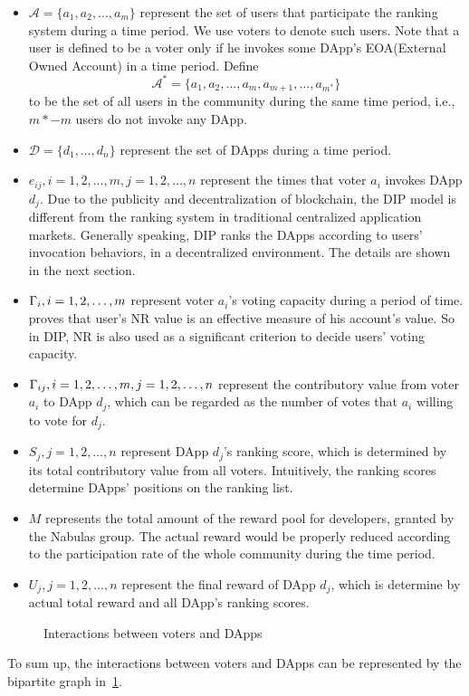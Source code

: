 \begin{itemize}
	\item $\mathcal{A}=\{a_1,a_2,\ldots,a_m\}$ represent the set of users that
	  participate the ranking system during a time period. We use voters to
	  denote such users. Note that a user is defined to be a voter only if he
	  invokes some DApp's EOA(External Owned Account) in a time period. Define
	  $$\mathcal{A}^*=\{a_1,a_2,\ldots,a_m,a_{m+1},\ldots,a_{m^*}\}$$
	to be the set of all users in the community during the same time period, i.e., $m*-m$ users do not invoke any DApp.
  \item $\mathcal{D}=\{d_1,\ldots,d_n\}$ represent the set of DApps during a time period.
  \item $e_{ij},i=1,2,\ldots,m, j=1,2,\ldots,n$ represent the times that voter $a_i$ invokes DApp $d_j$. Due to the publicity and decentralization of blockchain, the DIP model is different from the ranking system in traditional centralized application markets. Generally speaking, DIP ranks the DApps according to users' invocation behaviors, in a decentralized environment. The details are shown in the next section.

  \item $\Gamma_i, i=1,2,\ldots,m$ represent voter $a_i$'s voting capacity during a period of time.
  \cite{Nebulasyellowpaper} proves that user's NR value is an effective measure of his account's value. So in DIP, NR is also used as a significant criterion to decide users' voting capacity.
  \item $\Gamma_{ij}, i=1,2,\ldots,m,j=1,2,\ldots,n$ represent the contributory value from voter $a_i$ to DApp $d_j$, which can be regarded as the number of votes that $a_i$ willing to vote for $d_j$.

  \item $S_j, j=1,2,\ldots,n$ represent DApp $d_j$'s ranking score, which is determined by its total contributory value from all voters. Intuitively, the ranking scores determine DApps' positions on the ranking list.

  	\item $M$ represents the total amount of the reward pool for developers, granted by the Nabulas group.  The actual reward would be properly reduced according to the participation rate of the whole community during the time period.
   \item $U_j, j=1,2,\ldots,n$ represent the final reward of DApp $d_j$, which is determine by actual total reward and all DApp's ranking scores.
 \end{itemize}
   \begin{figure}
   	\centering
   	
   	\caption{Interactions between voters and DApps \label{fig:interact}}
   \end{figure}
  To sum up, the interactions between voters and DApps can be represented by the bipartite graph in~\ref{fig:interact}.

